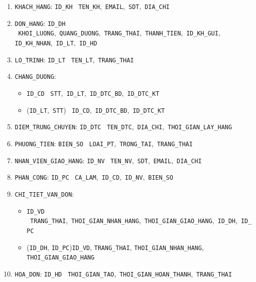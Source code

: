 \documentclass[11pt]{report}
\begin{document}
\begin{enumerate}
    \item \texttt{KHACH\_HANG}: \texttt{ID\_KH} \rightarrow \ \texttt{TEN\_KH},\ \texttt{EMAIL},\ \texttt{SDT},\ \texttt{DIA\_CHI}

    \item \texttt{DON\_HANG}: \texttt{ID\_DH} \rightarrow \ \texttt{KHOI\_LUONG},\ \texttt{QUANG\_DUONG},\ \texttt{TRANG\_THAI},\ \texttt{THANH\_TIEN},\ \texttt{ID\_KH\_GUI},\\ 
          \texttt{ID\_KH\_NHAN},\ \texttt{ID\_LT},\ \texttt{ID\_HD}

    \item \texttt{LO\_TRINH}: \texttt{ID\_LT} \rightarrow \ \texttt{TEN\_LT},\ \texttt{TRANG\_THAI}

    \item\texttt{CHANG\_DUONG}: \hfill
        \begin{itemize}
            \item \texttt{ID\_CD} \rightarrow \ \texttt{STT},\ \texttt{ID\_LT},\ \texttt{ID\_DTC\_BD},\ \texttt{ID\_DTC\_KT}
            
            \item (\texttt{ID\_LT},\ \texttt{STT}) \rightarrow \ \texttt{ID\_CD},\ \texttt{ID\_DTC\_BD},\ \texttt{ID\_DTC\_KT}
        \end{itemize}

    \item \texttt{DIEM\_TRUNG\_CHUYEN}: \texttt{ID\_DTC} \rightarrow \ \texttt{TEN\_DTC},\ \texttt{DIA\_CHI},\ \texttt{THOI\_GIAN\_LAY\_HANG}

    \item \texttt{PHUONG\_TIEN}: \texttt{BIEN\_SO} \rightarrow \ \texttt{LOAI\_PT},\ \texttt{TRONG\_TAI},\ \texttt{TRANG\_THAI}

    \item \texttt{NHAN\_VIEN\_GIAO\_HANG}: \texttt{ID\_NV} \rightarrow \ \texttt{TEN\_NV},\ \texttt{SDT},\ \texttt{EMAIL},\ \texttt{DIA\_CHI}

    \item \texttt{PHAN\_CONG}: \texttt{ID\_PC} \rightarrow \ \texttt{CA\_LAM},\ \texttt{ID\_CD},\ \texttt{ID\_NV},\ \texttt{BIEN\_SO}

    \item\texttt{CHI\_TIET\_VAN\_DON}: \hfill
        \begin{itemize}
            \item \texttt{ID\_VD} \rightarrow \ \texttt{TRANG\_THAI},\ \texttt{THOI\_GIAN\_NHAN\_HANG},\ \texttt{THOI\_GIAN\_GIAO\_HANG},\ \texttt{ID\_DH},\ \texttt{ID\_PC}
            
            \item (\texttt{ID\_DH}, \texttt{ID\_PC})\rightarrow \texttt{ID\_VD}, \texttt{TRANG\_THAI}, \texttt{THOI\_GIAN\_NHAN\_HANG}, \texttt{THOI\_GIAN\_GIAO\_HANG}
        \end{itemize}

    \item\texttt{HOA\_DON}:
        \texttt{ID\_HD} \rightarrow \ \texttt{THOI\_GIAN\_TAO},\ \texttt{THOI\_GIAN\_HOAN\_THANH},\ \texttt{TRANG\_THAI}
\end{enumerate}
\end{document}
